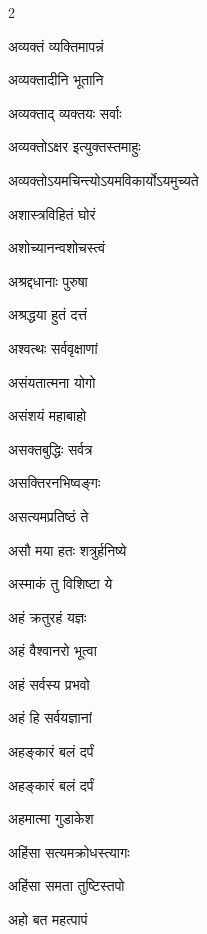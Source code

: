 \begin{multicols}{2}
\begin{indexlist}
\item अव्यक्तं व्यक्तिमापन्नं \dotfill {}
\item अव्यक्तादीनि भूतानि \dotfill {}
\item अव्यक्ताद् व्यक्तयः सर्वाः \dotfill {}
\item अव्यक्तोऽक्षर इत्युक्तस्तमाहुः \dotfill {}
\item अव्यक्तोऽयमचिन्त्योऽयमविकार्योऽयमुच्यते \dotfill {}
\item अशास्त्रविहितं घोरं \dotfill {}
\item अशोच्यानन्वशोचस्त्वं \dotfill {}
\item अश्रद्दधानाः पुरुषा \dotfill {}
\item अश्रद्धया हुतं दत्तं \dotfill {}
\item अश्वत्थः सर्ववृक्षाणां \dotfill {}
\item असंयतात्मना योगो \dotfill {}
\item असंशयं महाबाहो \dotfill {}
\item असक्तबुद्धिः सर्वत्र \dotfill {}
\item असक्तिरनभिष्वङ्गः \dotfill {}
\item असत्यमप्रतिष्ठं ते \dotfill {}
\item असौ मया हतः शत्रुर्हनिष्ये \dotfill {}
\item अस्माकं तु विशिष्टा ये \dotfill {}
\item अहं क्रतुरहं यज्ञः \dotfill {}
\item अहं वैश्वानरो भूत्वा \dotfill {}
\item अहं सर्वस्य प्रभवो \dotfill {}
\item अहं हि सर्वयज्ञानां \dotfill {}
\item अहङ्कारं बलं दर्पं \dotfill {}
\item अहङ्कारं बलं दर्पं \dotfill {}
\item अहमात्मा गुडाकेश \dotfill {}
\item अहिंसा सत्यमक्रोधस्त्यागः \dotfill {}
\item अहिंसा समता तुष्टिस्तपो \dotfill {}
\item अहो बत महत्पापं \dotfill {}
\end{indexlist}


\end{multicols}
